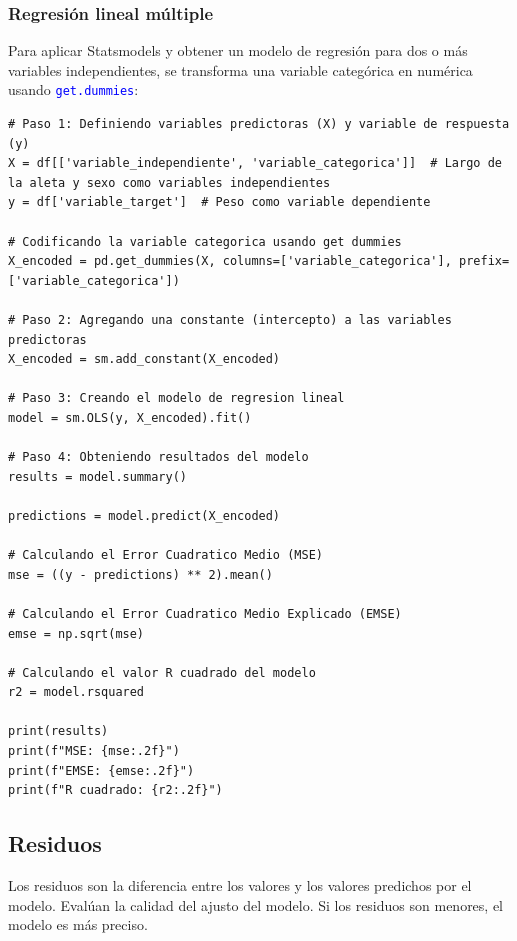 \documentclass[a4paper, 12pt]{book}
\begin{document}
\subsubsection{Regresión lineal múltiple}
Para aplicar Statsmodels y obtener un modelo de regresión para dos o más variables independientes, se transforma una variable categórica en numérica usando \texttt{\textcolor{blue}{get.dummies}}:
\begin{verbatim}
# Paso 1: Definiendo variables predictoras (X) y variable de respuesta (y)
X = df[['variable_independiente', 'variable_categorica']]  # Largo de la aleta y sexo como variables independientes
y = df['variable_target']  # Peso como variable dependiente
	
# Codificando la variable categorica usando get dummies
X_encoded = pd.get_dummies(X, columns=['variable_categorica'], prefix=['variable_categorica'])
	
# Paso 2: Agregando una constante (intercepto) a las variables predictoras
X_encoded = sm.add_constant(X_encoded)
	
# Paso 3: Creando el modelo de regresion lineal
model = sm.OLS(y, X_encoded).fit()
	
# Paso 4: Obteniendo resultados del modelo
results = model.summary()
	
predictions = model.predict(X_encoded)
	
# Calculando el Error Cuadratico Medio (MSE)
mse = ((y - predictions) ** 2).mean()
	
# Calculando el Error Cuadratico Medio Explicado (EMSE)
emse = np.sqrt(mse)
	
# Calculando el valor R cuadrado del modelo
r2 = model.rsquared
	
print(results)
print(f"MSE: {mse:.2f}")
print(f"EMSE: {emse:.2f}")
print(f"R cuadrado: {r2:.2f}")
\end{verbatim}



\subsection{Residuos}
Los residuos son la diferencia entre los valores y los valores predichos por el modelo. Evalúan la calidad del ajusto del modelo. Si los residuos son menores, el modelo es más preciso.
\end{document}

